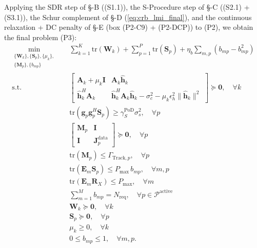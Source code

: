 \documentclass[12pt,a4paper]{article}
\newcommand{\vect}[1]{\mathbf{#1}}
\newcommand{\mat}[1]{\mathbf{#1}}
\newcommand{\tr}{\text{tr}}
\begin{document}
Applying the SDR step of \S-B ((S1.1)), the S-Procedure step of \S-C ((S2.1) + (S3.1)), the Schur complement of \S-D (\eqref{eq:crb_lmi_final}), and the continuous relaxation + DC penalty of \S-E (box (P2-C9) + (P2-DCP)) to (P2), we obtain the final problem (P3):
\begin{align}
\min_{\substack{\{\mat{W}_k\}, \{\mat{S}_p\}, \{\mu_k\}, \\ \{\mat{M}_p\}, \{b_{mp}\}}} \quad
& \sum_{k=1}^K \tr(\mat{W}_k) + \sum_{p=1}^P \tr(\mat{S}_p) + \eta_b \sum_{m, p} (b_{mp} - b_{mp}^2) \tag{P3} \\
\text{s.t.} \quad
& \begin{bmatrix} \mat{A}_k + \mu_k \mat{I} & \mat{A}_k \hat{\vect{h}}_k \\[1.5ex] \hat{\vect{h}}_k^H \mat{A}_k & \hat{\vect{h}}_k^H \mat{A}_k \hat{\vect{h}}_k - \sigma_c^2 - \mu_k \epsilon_h^2 \|\hat{\vect{h}}_k\|^2 \end{bmatrix} \succeq \mat{0}, \quad \forall k \tag{P3-C1} \label{eq:p3c1} \\
& \tr(\vect{g}_p \vect{g}_p^H \mat{S}_p) \geq \gamma_S^{\text{PoD}} \sigma_s^2, \quad \forall p \tag{P3-C2} \label{eq:p3c2} \\
& \begin{bmatrix} \mat{M}_p & \mat{I} \\ \mat{I} & \mat{J}_p^{\text{data}} \end{bmatrix} \succeq \mat{0}, \quad \forall p \tag{P3-C3} \label{eq:p3c3} \\
& \tr(\mat{M}_p) \leq \Gamma_{\text{Track},p}, \quad \forall p \tag{P3-C3b} \label{eq:p3c3b} \\
& \tr(\mat{E}_m \mat{S}_p) \leq P_{\max} \, b_{mp}, \quad \forall m, p \tag{P3-C4'a} \label{eq:p3c4a} \\
& \tr(\mat{E}_m \mat{R}_X) \leq P_{\max}, \quad \forall m \tag{P3-C4'b} \label{eq:p3c4b} \\
& \sum_{m=1}^{M} b_{mp} = N_{\text{req}}, \quad \forall p \in \mathcal{P}^{\text{active}} \tag{P3-C5'} \label{eq:p3c5} \\
& \mat{W}_k \succeq \mat{0}, \quad \forall k \tag{P3-C6} \label{eq:p3c6} \\
& \mat{S}_p \succeq \mat{0}, \quad \forall p \tag{P3-C7} \label{eq:p3c7} \\
& \mu_k \geq 0, \quad \forall k \tag{P3-C8} \label{eq:p3c8} \\
& 0 \leq b_{mp} \leq 1, \quad \forall m, p. \tag{P3-C9} \label{eq:p3c9}
\end{align}
\end{document}

